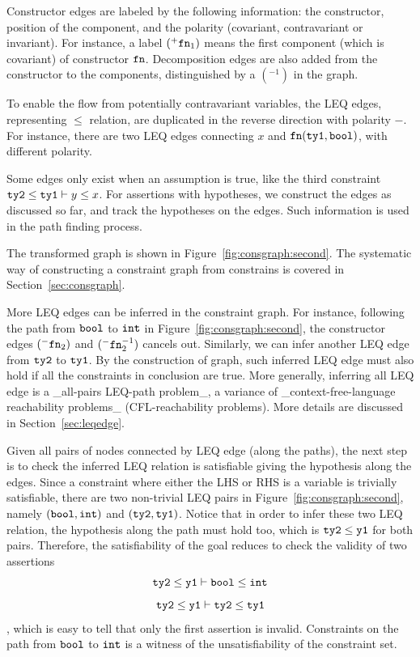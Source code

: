 Constructor edges are labeled by the following information: the constructor,
position of the component, and the polarity (covariant, contravariant or
invariant). For instance, a label $(^{+}\mathtt{fn}_1)$ means the first
component (which is covariant) of constructor $\mathtt{fn}$.
%
Decomposition edges are also added from the constructor to the components,
distinguished by a $(^{-1})$ in the graph.

To enable the flow from potentially contravariant variables, the LEQ edges,
representing $\leq$ relation, are duplicated in the reverse direction with
polarity $-$. For instance, there are two LEQ edges connecting $x$ and
$\mathtt{fn}(\mathtt{ty1},\mathtt{bool})$, with different polarity.

Some edges only exist when an assumption is true, like the third constraint
$\mathtt{ty2} \leq \mathtt{ty1} \vdash y \leq x$. For assertions with hypotheses, we
construct the edges as discussed so far, and track the hypotheses on the edges.
Such information is used in the path finding process.

The transformed graph is shown in Figure~\ref{fig:consgraph:second}. The
systematic way of constructing a constraint graph from constrains is covered in
Section~\ref{sec:consgraph}.

More LEQ edges can be inferred in the constraint graph. For instance, following
the path from $\mathtt{bool}$ to $\mathtt{int}$ in Figure~\ref{fig:consgraph:second},
the constructor edges $(^{-}\mathtt{fn}_2)$ and
$(^{-}\mathtt{fn}_2^{-1})$ cancels out. Similarly, we can infer another
LEQ edge from  $\mathtt{ty2}$ to $\mathtt{ty1}$. By the construction of graph, such
inferred LEQ edge must also hold if all the constraints in conclusion are true.
More generally, inferring all LEQ edge is a _all-pairs LEQ-path problem_, a
variance of _context-free-language reachability problems_ (CFL-reachability
problems). More details are discussed in Section~\ref{sec:leqedge}.

Given all pairs of nodes connected by LEQ edge (along the paths), the next step
is to check the inferred LEQ relation is satisfiable giving the hypothesis
along the edges. Since a constraint where either the LHS or RHS is a variable
is trivially satisfiable, there are two non-trivial LEQ pairs in
Figure~\ref{fig:consgraph:second}, namely $(\mathtt{bool, int})$ and $(\mathtt{ty2,
ty1})$. Notice that in order to infer these two LEQ relation, the hypothesis
along the path must hold too, which is $\mathtt{ty2}\leq \mathtt{y1}$ for both pairs.
Therefore, the satisfiability of the goal reduces to check the validity of two
assertions 
%
\[\mathtt{ty2}\leq \mathtt{y1}\vdash \mathtt{bool}\leq \mathtt{int}\]
\[\mathtt{ty2}\leq \mathtt{y1}\vdash \mathtt{ty2}\leq \mathtt{ty1}\]
, which is easy to tell that only the first assertion is invalid. Constraints
on the path from $\mathtt{bool}$ to $\mathtt{int}$ is a witness of the
unsatisfiability of the constraint set.

